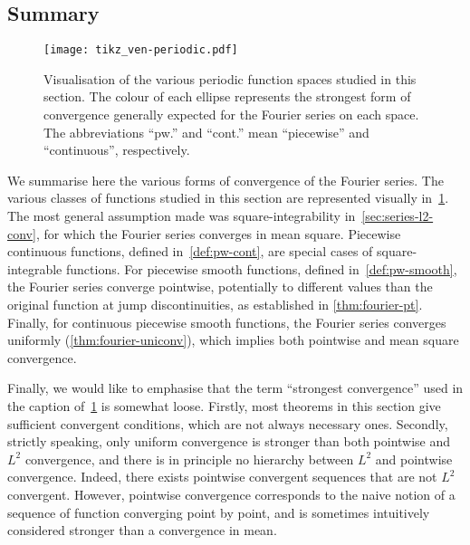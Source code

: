 \subsection{Summary}
\begin{figure}[t]
  \centering
  \texttt{[image: tikz\_ven-periodic.pdf]}
  \caption{Visualisation of the various periodic function spaces studied in this section.
    The colour of each ellipse represents the strongest form of convergence generally
    expected for the Fourier series on each space. The abbreviations ``pw.'' and ``cont.''
  mean ``piecewise'' and ``continuous'', respectively.}
  \label{fig:ven-periodic}
\end{figure}
We summarise here the various forms of convergence of the Fourier series. The various
classes of functions studied in this section are represented visually
in~\cref{fig:ven-periodic}. The most general assumption made was square-integrability
in~\cref{sec:series-l2-conv}, for which the Fourier series converges in mean square.
Piecewise continuous functions, defined in~\cref{def:pw-cont}, are special cases of
square-integrable functions. For piecewise smooth functions, defined
in~\cref{def:pw-smooth}, the Fourier series converge pointwise, potentially to different
values than the original function at jump discontinuities, as established in
\cref{thm:fourier-pt}. Finally, for continuous piecewise smooth functions, the Fourier
series converges uniformly (\cref{thm:fourier-uniconv}), which implies both pointwise and
mean square convergence.

Finally, we would like to emphasise that the term ``strongest convergence'' used in the
caption of~\cref{fig:ven-periodic} is somewhat loose. Firstly, most theorems in this
section give sufficient convergent conditions, which are not always necessary ones.
Secondly, strictly speaking, only uniform convergence is stronger than both pointwise and
$L^2$ convergence, and there is in principle no hierarchy between $L^2$ and pointwise
convergence. Indeed, there exists pointwise convergent sequences that are not $L^2$
convergent. However, pointwise convergence corresponds to the naive notion of a sequence
of function converging point by point, and is sometimes intuitively considered stronger
than a convergence in mean.
